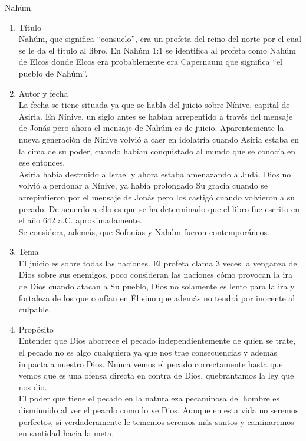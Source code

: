 %
%
\begin{section}{Nahúm}
	\begin{enumerate}
		\item Título\\
			Nahúm, que significa ``consuelo'', era un profeta del reino del norte por el cual se le da el título al libro. En Nahúm 1:1 se identifica al profeta como Nahúm de Elcos donde Elcos era probablemente era Capernaum que significa ``el pueblo de Nahúm''.
		\item Autor y fecha\\
			La fecha se tiene situada ya que se habla del juicio sobre Nínive, capital de Asiria. En Nínive, un siglo antes se habían arrepentido a través del mensaje de Jonás pero ahora el mensaje de Nahúm es de juicio. Aparentemente la nueva generación de Nínive volvió a caer en idolatría cuando Asiria estaba en la cima de su poder, cuando habían conquistado al mundo que se conocía en ese entonces.\\
			Asiria había destruido a Israel y ahora estaba amenazando a Judá. Dios no volvió a perdonar a Nínive, ya había prolongado Su gracia cuando se arrepintieron por el mensaje de Jonás pero los castigó cuando volvieron a su pecado. De acuerdo a ello es que se ha determinado que el libro fue escrito en el año 642 a.C. aproximadamente.\\
			Se considera, además, que Sofonías y Nahúm fueron contemporáneos.
		\item Tema\\ 
			El juicio es sobre todas las naciones. El profeta clama 3 veces la venganza de Dios sobre sus enemigos, poco consideran las naciones cómo provocan la ira de Dios cuando atacan a Su pueblo, Dios no solamente es lento para la ira y fortaleza de los que confían en Él sino que además no tendrá por inocente al culpable. 
		\item Propósito\\
			Entender que Dios aborrece el pecado independientemente de quien se trate, el pecado no es algo cualquiera ya que nos trae consecuencias y además impacta a nuestro Dios. Nunca vemos el pecado correctamente hasta que vemos que es una ofensa directa en contra de Dios, quebrantamos la ley que nos dio.\\
			El poder que tiene el pecado en la naturaleza pecaminosa del hombre es disminuido al ver el peacdo como lo ve Dios. Aunque en esta vida no seremos perfectos, si verdaderamente le tememos seremos más santos y caminaremos en santidad hacia la meta.

\end{enumerate}
\end{section}
